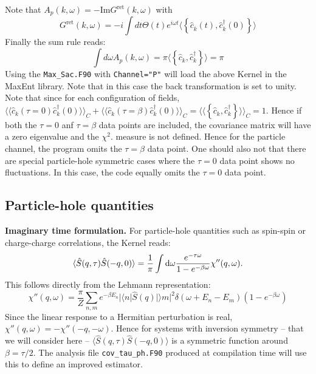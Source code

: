Note that  $ A_p(k, \omega)  = - \text{Im} G^{\text{ret}} (k, \omega) $ with 
\begin{equation}
	G^{\text{ret}} (k, \omega)  = -i \int d t \Theta(t)  e^{i \omega t} \langle \left\{ \hat{c}^{\phantom\dagger}_{k} (t), \hat{c}^{\dagger}_{k} (0) \right\} \rangle
\end{equation}
Finally the sum rule reads:
\begin{equation}
	\int d \omega  A_p(k, \omega)  = \pi \langle  \left\{ \hat{c}^{\phantom\dagger}_{k} , \hat{c}^{\dagger}_{k}  \right\}   \rangle = \pi 
\end{equation}
Using the \texttt{Max\_Sac.F90}  with \texttt{Channel="P"}   will  load the above Kernel in the MaxEnt library.  Note that in this case the back  transformation is set to unity.  
Note that since for each  configuration of fields,  $ \langle  \langle \hat{c}^{\phantom\dagger}_{k} (\tau=0)  \hat{c}^{\dagger}_{k} (0)   \rangle  \rangle_{C} +   
\langle \langle \hat{c}^{\phantom\dagger}_{k} (\tau=\beta)  \hat{c}^{\dagger}_{k} (0)   \rangle \rangle_{C} = 
\langle \langle \left\{ \hat{c}^{\phantom\dagger}_{k},   \hat{c}^{\dagger}_{k}    \right\} \rangle \rangle_{C}   = 1$.  Hence if both  the $\tau=0$ anf $\tau=\beta$ data points are included, the covariance matrix will have a zero eigenvalue and the $\chi^{2}$. measure is not defined. Hence for the particle channel, the program omits the $\tau=\beta$ data point.     One should also not that there are special  particle-hole symmetric  cases where the $\tau=0$ data point shows no  fluctuations. In this case, the 
code equally omits the $\tau=0$ data point. 

\subsection{Particle-hole quantities }

\noindent
\textbf{Imaginary time formulation.}
 For particle-hole quantities such as spin-spin or charge-charge correlations, 
the  Kernel reads:
\begin{equation}
	\langle \hat{S}(q,\tau) \hat{S}(-q,0) \rangle  = \frac{1}{\pi} 
   \int {\text d} \omega  \frac{e^{- \tau \omega} }{ 1 - e^{-\beta  \omega} } \chi''(q,\omega).
\end{equation}
This follows directly from the  Lehmann representation: 
\begin{equation}
 \chi''(q,\omega)  = \frac{\pi}{Z} \sum_{n,m} e^{-\beta E_n} |\langle n | \hat{S}(q) | \rangle m |^2 
\delta ( \omega + E_n - E_m) \left( 1 - e^{-\beta  \omega} \right) 
\end{equation}
Since the linear response to a Hermitian perturbation  is real, $\chi''(q,\omega)  = - \chi''(-q,-\omega)$.  Hence for systems with inversion symmetry -- that 
we will consider here -- $\langle \hat{S}(q,\tau) \hat{S}(-q,0) \rangle $ is a symmetric function around $\beta= \tau/2$.  The analysis  file \texttt{cov\_tau\_ph.F90} produced at compilation
time will use this  to define an improved estimator. 

